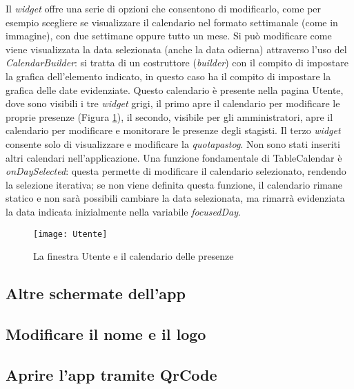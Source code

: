 Il \emph{widget} offre una serie di opzioni che consentono di modificarlo, come per esempio scegliere se visualizzare il calendario nel formato settimanale (come in immagine), con due settimane oppure tutto un mese.\newline
Si può modificare come viene visualizzata la data selezionata (anche la data odierna) attraverso l'uso del \emph{CalendarBuilder}: si tratta di un costruttore (\emph{builder}) con il compito di impostare la grafica dell'elemento indicato, in questo caso ha il compito di impostare la grafica delle date evidenziate.\newline
\newline
Questo calendario è presente nella pagina Utente, dove sono visibili i tre \emph{widget} grigi, il primo apre il calendario per modificare le proprie presenze (Figura \ref{fig:utente-presenze}), il secondo, visibile per gli amministratori, apre il calendario per modificare e monitorare le presenze degli stagisti.\newline
Il terzo \emph{widget} consente solo di visualizzare e modificare la \emph{\gls{quotapastog}}.\newline
Non sono stati inseriti altri calendari nell'applicazione.\newline
\newline
Una funzione fondamentale di TableCalendar è \emph{onDaySelected}: questa permette di modificare il calendario selezionato, rendendo la selezione iterativa; se non viene definita questa funzione, il calendario rimane statico e non sarà possibili cambiare la data selezionata, ma rimarrà evidenziata la data indicata inizialmente nella variabile \emph{focusedDay}.
\newpage
\begin{figure}[!h] 
    \centering 
    \texttt{[image: Utente]} 
    \caption{La finestra Utente e il calendario delle presenze}
    \label{fig:utente-presenze}
\end{figure}
\newpage

\subsection{Altre schermate dell'app}

\subsection{Modificare il nome e il logo}

\subsection{Aprire l'app tramite QrCode}